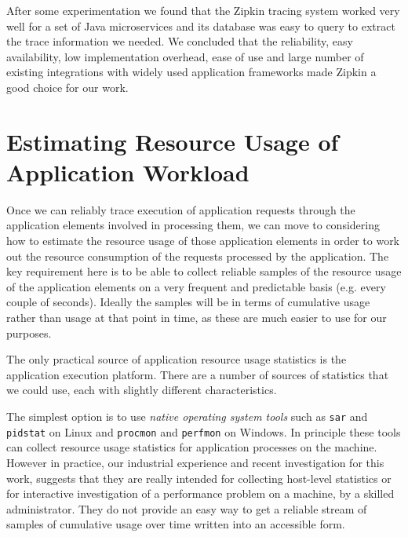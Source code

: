 After some experimentation we found that the Zipkin tracing system worked very well for a set of Java microservices and its database was easy to query to extract the trace information we needed.  We concluded that the reliability, easy availability, low implementation overhead, ease of use and large number of existing integrations with widely used application frameworks made Zipkin a good choice for our work.

\section{Estimating Resource Usage of Application Workload}
\label{section:resusageofappworkload}

Once we can reliably trace execution of application requests through the application elements involved in processing them, we can move to considering how to estimate the resource usage of those application elements in order to work out the resource consumption of the requests processed by the application.  The key requirement here is to be able to collect reliable samples of the resource usage of the application elements on a very frequent and predictable basis (e.g. every couple of seconds).  Ideally the samples will be in terms of cumulative usage rather than usage at that point in time, as these are much easier to use for our purposes.

The only practical source of application resource usage statistics is the application execution platform.  There are a number of sources of statistics that we could use, each with slightly different characteristics.

The simplest option is to use \emph{native operating system tools} such as \texttt{sar} and \texttt{pidstat} on Linux and \texttt{procmon} and \texttt{perfmon} on Windows.  In principle these tools can collect resource usage statistics for application processes on the machine.  However in practice, our industrial experience and recent investigation for this work, suggests that they are really intended for collecting host-level statistics or for interactive investigation of a performance problem on a machine, by a skilled administrator.  They do not provide an easy way to get a reliable stream of samples of cumulative usage over time written into an accessible form.

